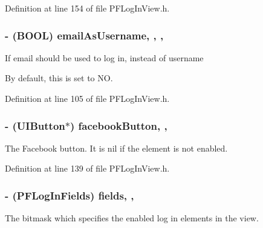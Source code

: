Definition at line 154 of file P\+F\+Log\+In\+View.\+h.

\hypertarget{interface_p_f_log_in_view_a5158167a0a95cdf25f18e5fe23a8368b}{}
\subsubsection[{email\+As\+Username}]{\setlength{\rightskip}{0pt plus 5cm}-\/ (B\+O\+O\+L) email\+As\+Username\hspace{0.3cm}{\ttfamily [read]}, {\ttfamily [write]}, {\ttfamily [nonatomic]}, {\ttfamily [assign]}}\label{interface_p_f_log_in_view_a5158167a0a95cdf25f18e5fe23a8368b}
If email should be used to log in, instead of username

By default, this is set to {\ttfamily N\+O}. 

Definition at line 105 of file P\+F\+Log\+In\+View.\+h.

\hypertarget{interface_p_f_log_in_view_afbed9acbbd4acf185fce057ab640ab23}{}
\subsubsection[{facebook\+Button}]{\setlength{\rightskip}{0pt plus 5cm}-\/ (U\+I\+Button$\ast$) facebook\+Button\hspace{0.3cm}{\ttfamily [read]}, {\ttfamily [nonatomic]}, {\ttfamily [strong]}}\label{interface_p_f_log_in_view_afbed9acbbd4acf185fce057ab640ab23}
The Facebook button. It is {\ttfamily nil} if the element is not enabled. 

Definition at line 139 of file P\+F\+Log\+In\+View.\+h.

\hypertarget{interface_p_f_log_in_view_a57c9766d511bca34b7f75fd4bd25a63d}{}
\subsubsection[{fields}]{\setlength{\rightskip}{0pt plus 5cm}-\/ (P\+F\+Log\+In\+Fields) fields\hspace{0.3cm}{\ttfamily [read]}, {\ttfamily [nonatomic]}, {\ttfamily [assign]}}\label{interface_p_f_log_in_view_a57c9766d511bca34b7f75fd4bd25a63d}
The bitmask which specifies the enabled log in elements in the view. 

